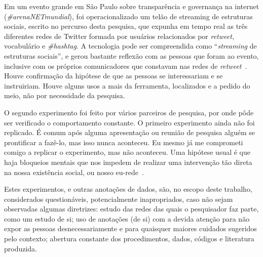\documentclass[a4paper,openright,12pt]{report} %
\begin{document}
	Em um evento grande em São Paulo sobre transparência e governança na internet (\emph{\#arenaNETmundial}),
        foi operacionalizado um telão de streaming de estruturas sociais, escrito
        no percurso desta pesquisa, que expunha em tempo real as três diferentes redes de Twitter
        formada por usuários relacionados por \emph{retweet}, vocabulário e \emph{\#hashtag}.
        A tecnologia pode ser compreendida como ``\emph{streaming} de estruturas sociais'',
        e gerou bastante reflexão com as pessoas que foram ao evento, inclusive
	com os próprios comunicadores que constavam nas redes de \emph{retweet}~\cite{ocupagov}.
        Houve confirmação da hipótese de que as pessoas se interessariam e se instruiriam.
        Houve alguns usos a mais da ferramenta, localizados e a pedido do meio, não
        por necessidade da pesquisa.

O segundo experimento foi feito por vários parceiros de pesquisa,
por onde pôde ser verificado o comportamento constante.
O primeiro experimento ainda não foi replicado.
É comum após alguma apresentação ou reunião de pesquisa
alguém se prontificar a fazê-lo,
mas isso nunca aconteceu. 
Eu mesmo já me comprometi comigo a replicar o experimento,
mas não aconteceu. Uma hipótese usual é que haja bloqueios
mentais que nos impedem de realizar uma intervenção tão direta
na nossa existência social, ou nosso eu-rede~\cite{latour2013,ciberiun}.

Estes experimentos, e outras anotações de dados, são, no escopo deste
trabalho, considerados questionáveis, potencialmente inapropriados,
caso não sejam observadas algumas diretrizes:
    estudo das redes das quais o pesquisador faz parte, como um estudo de si;
    uso de anotações (de si) com a devida atenção para não expor as pessoas desnecessariamente
    e para quaisquer maiores cuidados sugeridos pelo contexto;
    abertura constante dos procedimentos, dados, códigos e literatura produzida.

\end{document}
